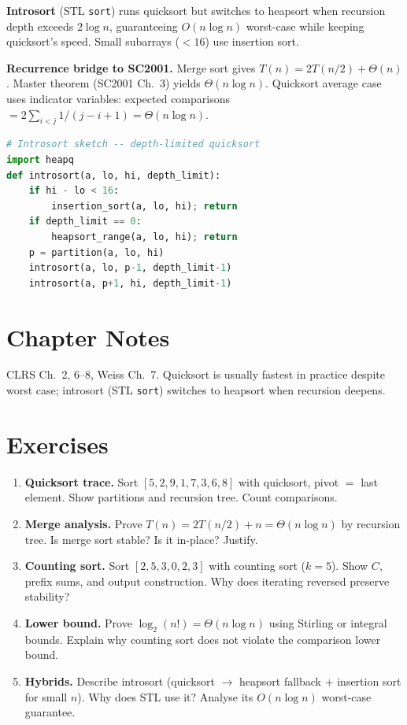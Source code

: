 \textbf{Introsort} (STL \texttt{sort}) runs quicksort but switches to heapsort when recursion depth exceeds $2\log n$, guaranteeing $O(n\log n)$ worst-case while keeping quicksort's speed. Small subarrays ($<16$) use insertion sort.

\textbf{Recurrence bridge to SC2001.} Merge sort gives $T(n)=2T(n/2)+\Theta(n)$. Master theorem (SC2001 Ch.~3) yields $\Theta(n\log n)$. Quicksort average case uses indicator variables: expected comparisons $=2\sum_{i<j}1/(j-i+1)=\Theta(n\log n)$.

\begin{lstlisting}[language=Python]
# Introsort sketch -- depth-limited quicksort
import heapq
def introsort(a, lo, hi, depth_limit):
    if hi - lo < 16:
        insertion_sort(a, lo, hi); return
    if depth_limit == 0:
        heapsort_range(a, lo, hi); return
    p = partition(a, lo, hi)
    introsort(a, lo, p-1, depth_limit-1)
    introsort(a, p+1, hi, depth_limit-1)
\end{lstlisting}

\section{Chapter Notes}
CLRS Ch.~2, 6--8, Weiss Ch.~7. Quicksort is usually fastest in practice despite worst case; introsort (STL \texttt{sort}) switches to heapsort when recursion deepens.

\section{Exercises}
\label{sec:ch08-exercises}
\begin{enumerate}[label=E8.\arabic*, leftmargin=*, itemsep=0.7em]
    \item \textbf{Quicksort trace.} Sort $[5,2,9,1,7,3,6,8]$ with quicksort, pivot $=$ last element. Show partitions and recursion tree. Count comparisons.
    \item \textbf{Merge analysis.} Prove $T(n)=2T(n/2)+n=\Theta(n\log n)$ by recursion tree. Is merge sort stable? Is it in-place? Justify.
    \item \textbf{Counting sort.} Sort $[2,5,3,0,2,3]$ with counting sort ($k=5$). Show $C$, prefix sums, and output construction. Why does iterating reversed preserve stability?
    \item \textbf{Lower bound.} Prove $\log_{2}(n!)=\Theta(n\log n)$ using Stirling or integral bounds. Explain why counting sort does not violate the comparison lower bound.
    \item \textbf{Hybrids.} Describe introsort (quicksort $\to$ heapsort fallback + insertion sort for small $n$). Why does STL use it? Analyse its $O(n\log n)$ worst-case guarantee.
\end{enumerate}
